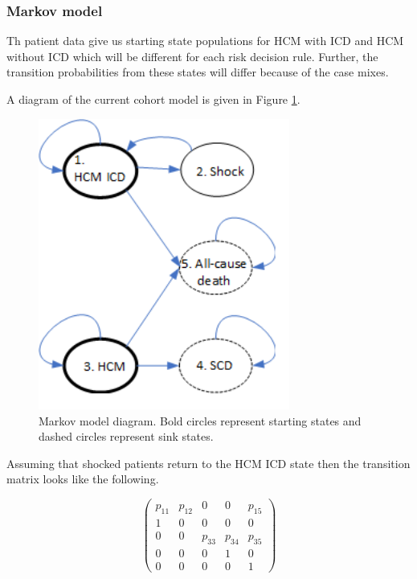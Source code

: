 \documentclass[
]{article}
\begin{document}
\hypertarget{markov-model}{%
\subsubsection{Markov model}\label{markov-model}}

Th patient data give us starting state populations for HCM with ICD and HCM without ICD which will be different for each risk decision rule.
Further, the transition probabilities from these states will differ because of the case mixes.

A diagram of the current cohort model is given in Figure \ref{fig:model}.

\begin{figure}

{\centering \includegraphics[width=3.25in]{../../images/model_diagram} 

}

\caption{Markov model diagram. Bold circles represent starting states and dashed circles represent sink states.}\label{fig:model}
\end{figure}

Assuming that shocked patients return to the HCM ICD state then the transition matrix looks like the following.

\[
\begin{pmatrix}
p_{11} & p_{12} & 0 & 0 & p_{15}\\
1 & 0 & 0 & 0 & 0\\
0 & 0 & p_{33} & p_{34} & p_{35}\\
0 & 0 & 0 & 1 & 0\\
0 & 0 & 0 & 0 & 1
\end{pmatrix}
\]
\end{document}
